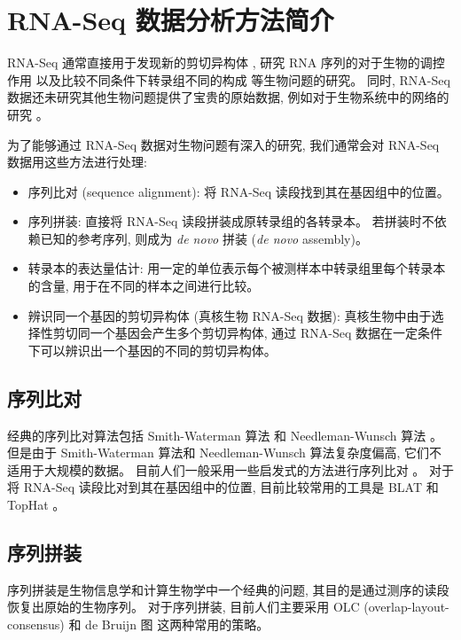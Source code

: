\section{RNA-Seq 数据分析方法简介}
RNA-Seq 通常直接用于发现新的剪切异构体 
\cite{merkin2012evolutionary, wang2010novo, roberts2011identification, wang2010mapsplice}, 
研究 RNA 序列的对于生物的调控作用 \cite{van2011xuts}
以及比较不同条件下转录组不同的构成 \cite{trapnell2012differential}
等生物问题的研究。
同时, RNA-Seq 数据还未研究其他生物问题提供了宝贵的原始数据, 
例如对于生物系统中的网络的研究 \cite{shalek2013single,sinicropi2012whole}。 

为了能够通过 RNA-Seq 数据对生物问题有深入的研究, 
我们通常会对 RNA-Seq 数据用这些方法进行处理:
\begin{itemize}
\item 序列比对 (sequence alignment): 将 RNA-Seq 读段找到其在基因组中的位置。

\item 序列拼装: 
直接将 RNA-Seq 读段拼装成原转录组的各转录本。 若拼装时不依赖已知的参考序列, 
则成为 \textit{de novo} 拼装 (\textit{de novo} assembly)。 

\item 转录本的表达量估计: 用一定的单位表示每个被测样本中转录组里每个转录本的含量, 
用于在不同的样本之间进行比较。

\item 辨识同一个基因的剪切异构体 (真核生物 RNA-Seq 数据): 真核生物中由于选择性剪切同一个基因会产生多个剪切异构体, 
通过 RNA-Seq 数据在一定条件下可以辨识出一个基因的不同的剪切异构体。
\end{itemize}

\subsection{序列比对}
经典的序列比对算法包括 Smith-Waterman 算法 \cite{SmithWaterman1981} 和 Needleman-Wunsch 算法 \cite{needleman1970general}。 
但是由于 Smith-Waterman 算法和 Needleman-Wunsch 算法复杂度偏高, 它们不适用于大规模的数据。 
目前人们一般采用一些启发式的方法进行序列比对 \cite{isaev2004introduction}。 
对于将 RNA-Seq 读段比对到其在基因组中的位置, 目前比较常用的工具是 
BLAT \cite{kent2002blat}
和 TopHat \cite{trapnell2009tophat}。

\subsection{序列拼装}
序列拼装是生物信息学和计算生物学中一个经典的问题, 
其目的是通过测序的读段恢复出原始的生物序列。 对于序列拼装, 目前人们主要采用 
OLC (overlap-layout-consensus) \cite{greenphrap, bonfield1995new, 
kececioglu1995combinatorial, myers1995toward, huang1999cap3}
和 de Bruijn 图 \cite{pevzner2001eulerian} 
这两种常用的策略。

